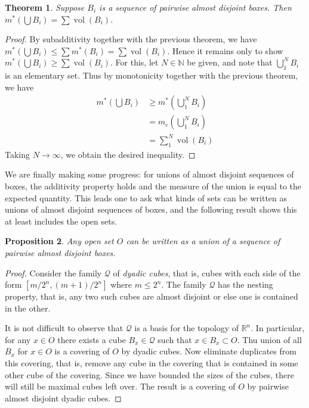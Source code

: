\documentclass[11pt,oneside]{amsbook}
\newcommand{\NN}{\mathbb N}
\newcommand{\RR}{\mathbb R}
\DeclareMathOperator{\vol}{vol}
\theoremstyle{definition}
\theoremstyle{plain}
\newtheorem{thm}{Theorem}[section]
\newtheorem{prop}[thm]{Proposition}
\theoremstyle{definition}
\theoremstyle{remark}
\numberwithin{equation}{section}
\numberwithin{figure}{section}
\begin{document}
\begin{thm}
  Suppose $B_i$ is a sequence of pairwise almost disjoint boxes. Then $m^*(\bigcup B_i)=\sum\vol(B_i)$.
\end{thm}

\begin{proof}
  By subadditivity together with the previous theorem, we have $m^*(\bigcup B_i)\leq\sum m^*(B_i)=\sum\vol(B_i)$. Hence it remains only to show $m^*(\bigcup B_i)\geq\sum\vol(B_i)$. For this, let $N\in\NN$ be given, and note that $\bigcup_1^NB_i$ is an elementary set. Thus by monotonicity together with the previous theorem, we have
  \begin{align*}
    m^*(\bigcup B_i)&\geq m^*(\bigcup_1^NB_i)\\
                    &=m_e(\bigcup_1^NB_i)\\
                    &=\sum_1^N\vol(B_i)
  \end{align*}
  Taking $N\to\infty$, we obtain the desired inequality.
\end{proof}

We are finally making some progress: for unions of almost disjoint sequences of boxes, the additivity property holds and the measure of the union is equal to the expected quantity. This leads one to ask what kinds of sets can be written as unions of almost disjoint sequences of boxes, and the following result shows this at least includes the open sets.

\begin{prop}
  Any open set $O$ can be written as a union of a sequence of pairwise almost disjoint boxes.
\end{prop}

\begin{proof}
  Consider the family $\mathcal Q$ of \emph{dyadic cubes}, that is, cubes with each side of the form $[m/2^n,(m+1)/2^n]$ where $m\leq 2^n$. The family $\mathcal Q$ has the nesting property, that is, any two such cubes are almost disjoint or else one is contained in the other.

  It is not difficult to observe that $\mathcal Q$ is a basis for the topology of $\RR^n$. In particular, for any $x\in O$ there exists a cube $B_x\in\mathcal Q$ such that $x\in B_x\subset O$. Thu union of all $B_x$ for $x\in O$ is a covering of $O$ by dyadic cubes. Now eliminate duplicates from this covering, that is, remove any cube in the covering that is contained in some other cube of the covering. Since we have bounded the sizes of the cubes, there will still be maximal cubes left over. The result is a covering of $O$ by pairwise almost disjoint dyadic cubes.
\end{proof}
\end{document}

